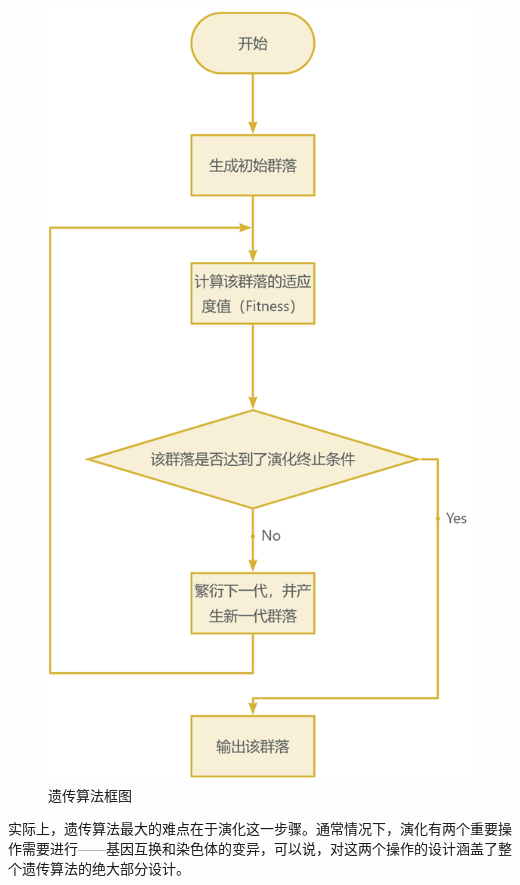 \begin{figure}[h]
    \centering
    \includegraphics[scale=0.15]{res/GeneticAlgorithmDiagram.png}
    \caption{遗传算法框图}
    \label{GeneticAlgorithmDiagram}
\end{figure}

实际上，遗传算法最大的难点在于演化这一步骤。通常情况下，演化有两个重要操作需要进行——基因互换和染色体的变异，可以说，对这两个操作的设计涵盖了整个遗传算法的绝大部分设计。


